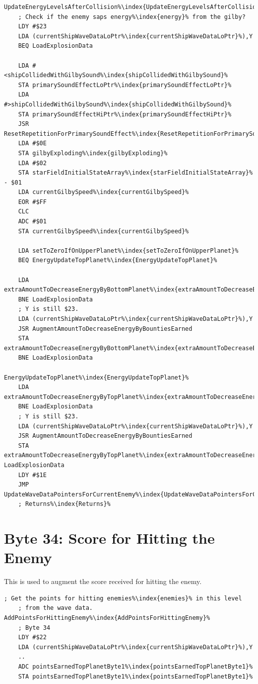 \begin{lstlisting}[escapechar=\%]
UpdateEnergyLevelsAfterCollision%\index{UpdateEnergyLevelsAfterCollision}%
    ; Check if the enemy saps energy%\index{energy}% from the gilby?
    LDY #$23
    LDA (currentShipWaveDataLoPtr%\index{currentShipWaveDataLoPtr}%),Y
    BEQ LoadExplosionData

    LDA #<shipCollidedWithGilbySound%\index{shipCollidedWithGilbySound}%
    STA primarySoundEffectLoPtr%\index{primarySoundEffectLoPtr}%
    LDA #>shipCollidedWithGilbySound%\index{shipCollidedWithGilbySound}%
    STA primarySoundEffectHiPtr%\index{primarySoundEffectHiPtr}%
    JSR ResetRepetitionForPrimarySoundEffect%\index{ResetRepetitionForPrimarySoundEffect}%
    LDA #$0E
    STA gilbyExploding%\index{gilbyExploding}%
    LDA #$02
    STA starFieldInitialStateArray%\index{starFieldInitialStateArray}% - $01
    LDA currentGilbySpeed%\index{currentGilbySpeed}%
    EOR #$FF
    CLC
    ADC #$01
    STA currentGilbySpeed%\index{currentGilbySpeed}%

    LDA setToZeroIfOnUpperPlanet%\index{setToZeroIfOnUpperPlanet}%
    BEQ EnergyUpdateTopPlanet%\index{EnergyUpdateTopPlanet}%

    LDA extraAmountToDecreaseEnergyByBottomPlanet%\index{extraAmountToDecreaseEnergyByBottomPlanet}%
    BNE LoadExplosionData
    ; Y is still $23.
    LDA (currentShipWaveDataLoPtr%\index{currentShipWaveDataLoPtr}%),Y
    JSR AugmentAmountToDecreaseEnergyByBountiesEarned
    STA extraAmountToDecreaseEnergyByBottomPlanet%\index{extraAmountToDecreaseEnergyByBottomPlanet}%
    BNE LoadExplosionData

EnergyUpdateTopPlanet%\index{EnergyUpdateTopPlanet}%   
    LDA extraAmountToDecreaseEnergyByTopPlanet%\index{extraAmountToDecreaseEnergyByTopPlanet}%
    BNE LoadExplosionData
    ; Y is still $23.
    LDA (currentShipWaveDataLoPtr%\index{currentShipWaveDataLoPtr}%),Y
    JSR AugmentAmountToDecreaseEnergyByBountiesEarned
    STA extraAmountToDecreaseEnergyByTopPlanet%\index{extraAmountToDecreaseEnergyByTopPlanet}%
LoadExplosionData
    LDY #$1E
    JMP UpdateWaveDataPointersForCurrentEnemy%\index{UpdateWaveDataPointersForCurrentEnemy}%
    ; Returns%\index{Returns}%

\end{lstlisting}

\section{Byte 34: Score for Hitting the Enemy}
This is used to augment the score received for hitting the enemy.
\begin{lstlisting}[escapechar=\%]
    ; Get the points for hitting enemies%\index{enemies}% in this level
    ; from the wave data.
AddPointsForHittingEnemy%\index{AddPointsForHittingEnemy}%   
    ; Byte 34
    LDY #$22
    LDA (currentShipWaveDataLoPtr%\index{currentShipWaveDataLoPtr}%),Y
    ..
    ADC pointsEarnedTopPlanetByte1%\index{pointsEarnedTopPlanetByte1}%
    STA pointsEarnedTopPlanetByte1%\index{pointsEarnedTopPlanetByte1}%
\end{lstlisting}

